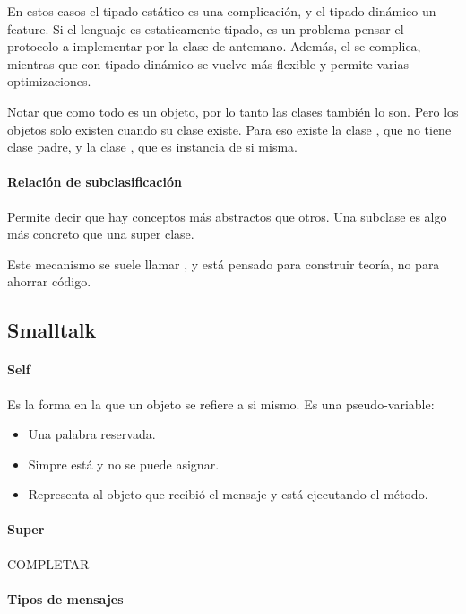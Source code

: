 En estos casos el tipado estático es una complicación, y el tipado dinámico un feature. Si el lenguaje es estaticamente tipado, es un problema pensar el protocolo a implementar por la clase de antemano. Además, el  se complica, mientras que con tipado dinámico se vuelve más flexible y permite varias optimizaciones.

Notar que como todo es un objeto, por lo tanto las clases también lo son. Pero los objetos solo existen cuando su clase existe. Para eso existe la clase , que no tiene clase padre, y la clase , que es instancia de si misma.

\paragraph{Relación de subclasificación}

Permite decir que hay conceptos más abstractos que otros. Una subclase es algo más concreto que una super clase.

Este mecanismo se suele llamar , y está pensado para construir teoría, no para ahorrar código.

\subsection{Smalltalk}

\paragraph{Self}

Es la forma en la que un objeto se refiere a si mismo. Es una pseudo-variable:
\begin{itemize}
  \item Una palabra reservada.
  \item Simpre está y no se puede asignar.
  \item Representa al objeto que recibió el mensaje y está ejecutando el método.
\end{itemize}

\paragraph{Super}

COMPLETAR

\paragraph{Tipos de mensajes}

